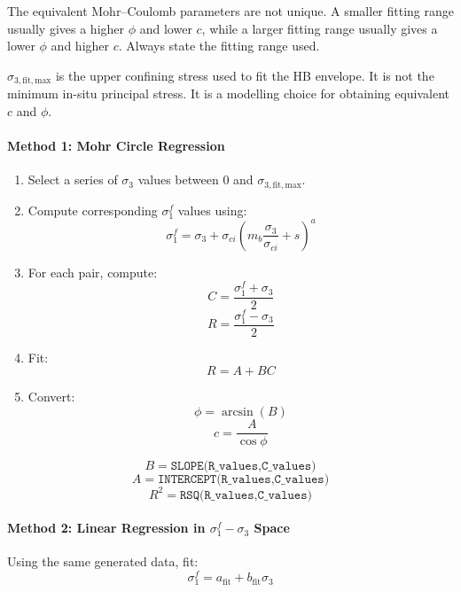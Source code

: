\begin{warnbox}
The equivalent Mohr--Coulomb parameters are not unique. A smaller fitting range usually
gives a higher \(\phi\) and lower \(c\), while a larger fitting range usually gives a lower
\(\phi\) and higher \(c\). Always state the fitting range used.
\end{warnbox}

\begin{notebox}
\(\sigma_{3,\mathrm{fit,max}}\) is the upper confining stress used to fit the HB envelope.
It is not the minimum in-situ principal stress. It is a modelling choice for obtaining
equivalent \(c\) and \(\phi\).
\end{notebox}

\paragraph{Method 1: Mohr Circle Regression}

\begin{enumerate}
 \item Select a series of \(\sigma_3\) values between 0 and \(\sigma_{3,\mathrm{fit,max}}\).
 \item Compute corresponding \(\sigma_1^f\) values using:
 \[
 \sigma_1^f =
 \sigma_3+
 \sigma_{ci}
 \left(
 m_b\frac{\sigma_3}{\sigma_{ci}}+s
 \right)^a
 \]
 \item For each pair, compute:
 \[
 C=\frac{\sigma_1^f+\sigma_3}{2}
 \]
 \[
 R=\frac{\sigma_1^f-\sigma_3}{2}
 \]
 \item Fit:
 \[
 R=A+BC
 \]
 \item Convert:
 \[
 \phi=\arcsin(B)
 \]
 \[
 c=\frac{A}{\cos\phi}
 \]
\end{enumerate}

\begin{calcbox}
\[
B=\texttt{SLOPE(R\_values,C\_values)}
\]
\[
A=\texttt{INTERCEPT(R\_values,C\_values)}
\]
\[
R^2=\texttt{RSQ(R\_values,C\_values)}
\]
\end{calcbox}

\paragraph{Method 2: Linear Regression in \(\sigma_1^f-\sigma_3\) Space}

Using the same generated data, fit:
\[
\sigma_1^f=a_{\mathrm{fit}}+b_{\mathrm{fit}}\sigma_3
\]

